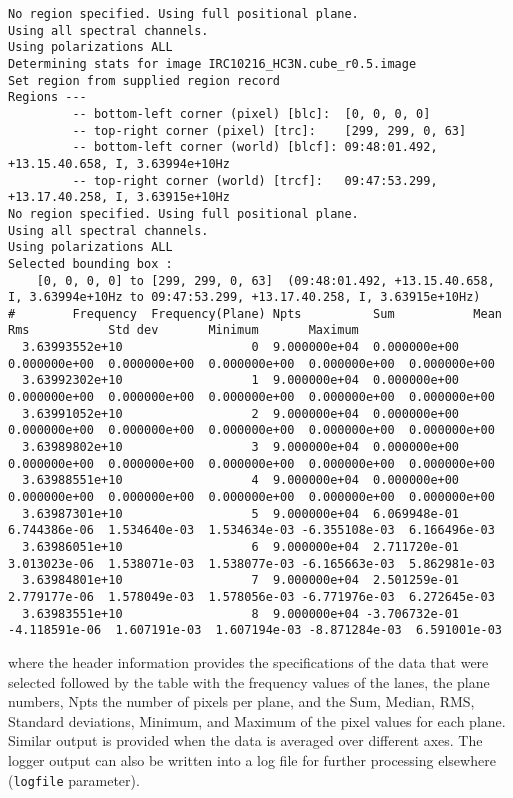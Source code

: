 \small
\begin{verbatim}
No region specified. Using full positional plane.
Using all spectral channels.
Using polarizations ALL
Determining stats for image IRC10216_HC3N.cube_r0.5.image
Set region from supplied region record
Regions --- 
         -- bottom-left corner (pixel) [blc]:  [0, 0, 0, 0]
         -- top-right corner (pixel) [trc]:    [299, 299, 0, 63]
         -- bottom-left corner (world) [blcf]: 09:48:01.492, +13.15.40.658, I, 3.63994e+10Hz
         -- top-right corner (world) [trcf]:   09:47:53.299, +13.17.40.258, I, 3.63915e+10Hz
No region specified. Using full positional plane.
Using all spectral channels.
Using polarizations ALL
Selected bounding box : 
    [0, 0, 0, 0] to [299, 299, 0, 63]  (09:48:01.492, +13.15.40.658, I, 3.63994e+10Hz to 09:47:53.299, +13.17.40.258, I, 3.63915e+10Hz)
#        Frequency  Frequency(Plane) Npts          Sum           Mean          Rms           Std dev       Minimum       Maximum     
  3.63993552e+10                  0  9.000000e+04  0.000000e+00  0.000000e+00  0.000000e+00  0.000000e+00  0.000000e+00  0.000000e+00
  3.63992302e+10                  1  9.000000e+04  0.000000e+00  0.000000e+00  0.000000e+00  0.000000e+00  0.000000e+00  0.000000e+00
  3.63991052e+10                  2  9.000000e+04  0.000000e+00  0.000000e+00  0.000000e+00  0.000000e+00  0.000000e+00  0.000000e+00
  3.63989802e+10                  3  9.000000e+04  0.000000e+00  0.000000e+00  0.000000e+00  0.000000e+00  0.000000e+00  0.000000e+00
  3.63988551e+10                  4  9.000000e+04  0.000000e+00  0.000000e+00  0.000000e+00  0.000000e+00  0.000000e+00  0.000000e+00
  3.63987301e+10                  5  9.000000e+04  6.069948e-01  6.744386e-06  1.534640e-03  1.534634e-03 -6.355108e-03  6.166496e-03
  3.63986051e+10                  6  9.000000e+04  2.711720e-01  3.013023e-06  1.538071e-03  1.538077e-03 -6.165663e-03  5.862981e-03
  3.63984801e+10                  7  9.000000e+04  2.501259e-01  2.779177e-06  1.578049e-03  1.578056e-03 -6.771976e-03  6.272645e-03
  3.63983551e+10                  8  9.000000e+04 -3.706732e-01 -4.118591e-06  1.607191e-03  1.607194e-03 -8.871284e-03  6.591001e-03
\end{verbatim}

where the header information provides the specifications of the data
that were selected followed by the table with the frequency values of
the lanes, the plane numbers,
Npts the number of pixels per plane, and the Sum, Median, RMS, Standard
deviations, Minimum, and Maximum of the pixel values for each
plane. Similar output is provided when the data is averaged over
different axes. The logger output can also be written into a log file
for further processing elsewhere ({\tt logfile} parameter). 


